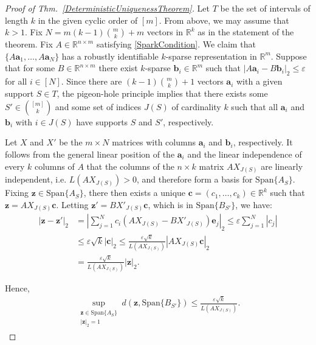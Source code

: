 \documentclass[journal, twocolumn]{IEEEtran}
\begin{document}
\begin{proof}[Proof of Thm.~\ref{DeterministicUniquenessTheorem}]
Let $T$ be the set of intervals of length $k$ in the given cyclic order of $[m]$. From above, we may assume that $k > 1$. Fix $N = m(k-1){m \choose k}+m$ vectors in $\mathbb{R}^k$ as in the statement of the theorem. Fix $A \in \mathbb{R}^{n \times m}$ satisfying \eqref{SparkCondition}. We claim that $\{A\mathbf{a}_1, \ldots, A\mathbf{a}_N\}$ has a robustly identifiable $k$-sparse representation in $\mathbb{R}^m$. Suppose that for some $B \in \mathbb{R}^{n \times m}$ there exist $k$-sparse $\mathbf{b}_i \in \mathbb{R}^m$ such that $|A\mathbf{a}_i - B\mathbf{b}_i|_2 \leq \varepsilon$ for all $i \in [N]$. Since there are $(k-1){m \choose k}+1$ vectors $\mathbf{a}_i$ with a given support $S \in T$, the pigeon-hole principle implies that there exists some $S' \in {[m] \choose k}$ and some set of indices $J(S)$ of cardinality $k$ such that all $\mathbf{a}_i$ and $\mathbf{b}_i$ with $i \in J(S)$ have supports $S$ and $S'$, respectively.

Let $X$ and $X'$ be the $m \times N$ matrices with columns $\mathbf{a}_i$ and $\mathbf{b}_i$, respectively. It follows from the general linear position of the $\mathbf{a}_i$ and the linear independence of every $k$ columns of $A$ that the columns of the $n \times k$ matrix $AX_{J(S)}$ are linearly independent, i.e. $L(AX_{J(S)}) > 0$, and therefore form a basis for $\text{Span}\{A_{S}\}$. Fixing $\mathbf{z} \in \text{Span}\{A_{S}\}$, there then exists a unique $\mathbf{c} = (c_1, \ldots, c_k) \in \mathbb{R}^k$ such that $\mathbf{z} = AX_{J(S)}\mathbf{c}$. Letting $\mathbf{z'} = BX'_{J(S)}\mathbf{c}$, which is in $\text{Span}\{B_{S'}\}$, we have:
\begin{align*}
|\mathbf{z} - \mathbf{z'}|_2 
&= |\sum_{j=1}^N c_i(AX_{J(S)} - BX'_{J(S)})\mathbf{e}_j|_2 
\leq \varepsilon \sum_{j=1}^N |c_j| \\
&\leq \varepsilon \sqrt{k}  |\mathbf{c}|_2 
\leq \frac{\varepsilon \sqrt{k}}{L(AX_{J(S)})} |AX_{J(S)}\mathbf{c}|_2 \\
&= \frac{\varepsilon \sqrt{k}}{L(AX_{J(S)})} |\mathbf{z}|_2.
\end{align*}

Hence,
\begin{align}\label{ABSubspaceDistance}
\sup_{ \substack{ \mathbf{z} \in \text{Span}\{A_{S}\} \\ |\mathbf{z}|_2 = 1} } d(\mathbf{z}, \text{Span}\{B_{S'}\}) \leq \frac{\varepsilon\sqrt{k}}{L(AX_{J(S)})}.
\end{align}


\end{proof}
\end{document}
